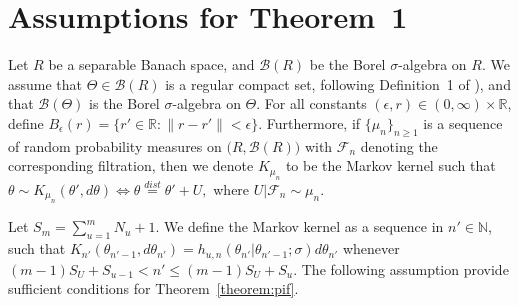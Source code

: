 \section{Assumptions for Theorem~1}\label{sec:assumptions}

Let $R$ be a separable Banach space, and $\mathcal{B}(R)$ be the Borel $\sigma$-algebra on $R$. We assume that $\Theta \in \mathcal{B}(R)$ is a regular compact set, following Definition~1 of \citet{chen24}), and that $\mathcal{B}(\Theta)$ is the Borel $\sigma$-algebra on $\Theta$.
For all constants $(\epsilon, r) \in (0, \infty) \times \mathbb{R}$, define $B_\epsilon(r) = \{r' \in \mathbb{R}: \|r - r'\| < \epsilon\}$.
Furthermore, if $\{\mu_n\}_{n \geq 1}$ is a sequence of random probability measures on $\big(R, \mathcal{B}(R)\big)$ with $\mathcal{F}_n$ denoting the corresponding filtration, then we denote $K_{\mu_n}$ to be the Markov kernel such that $\theta \sim K_{\mu_n}(\theta', d\theta) \iff \theta \overset{dist}{=}\theta' + U,$ where $U|\mathcal{F}_n \sim \mu_n$.

Let $S_m = \sum_{u = 1}^m N_u + 1$. 
We define the Markov kernel as a sequence in $n' \in \mathbb{N}$, such that $K_{n'}(\theta_{n'-1}, d\theta_{n'}) = h_{u, n}(\theta_{n'}|\theta_{n'-1};\sigma)d\theta_{n'}$ whenever $(m-1)S_U + S_{u-1} < n' \leq (m-1)S_U + S_{u}$.
The following assumption provide sufficient conditions for Theorem~\ref{theorem:pif}. 

